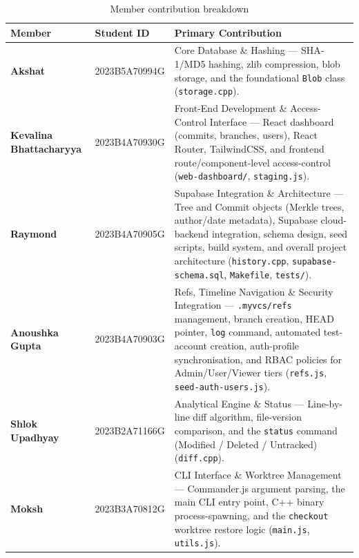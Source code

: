 \documentclass{article}
\begin{document}
\begin{table}[htbp]
\centering
\renewcommand{\arraystretch}{1.4}
\begin{tabular}{l l p{7cm}}
\toprule
Member & Student ID & Primary Contribution \\
\midrule
\textbf{Akshat}
    & 2023B5A70994G
    & Core Database \& Hashing --- SHA-1/MD5 hashing, zlib compression,
      blob storage, and the foundational \texttt{Blob} class
      (\texttt{storage.cpp}). \\
\textbf{Kevalina Bhattacharyya}
    & 2023B4A70930G
    & Front-End Development \& Access-Control Interface --- React dashboard
      (commits, branches, users), React Router, TailwindCSS, and
      frontend route/component-level access-control
      (\texttt{web-dashboard/}, \texttt{staging.js}). \\
\textbf{Raymond}
    & 2023B4A70905G
    & Supabase Integration \& Architecture --- Tree and Commit objects
      (Merkle trees, author/date metadata), Supabase cloud-backend
      integration, schema design, seed scripts, build system, and
      overall project architecture
      (\texttt{history.cpp}, \texttt{supabase-schema.sql},
       \texttt{Makefile}, \texttt{tests/}). \\
\textbf{Anoushka Gupta}
    & 2023B4A70903G
    & Refs, Timeline Navigation \& Security Integration ---
      \texttt{.myvcs/refs} management, branch creation, HEAD pointer,
      \texttt{log} command, automated test-account creation, auth-profile
      synchronisation, and RBAC policies for Admin/User/Viewer tiers
      (\texttt{refs.js}, \texttt{seed-auth-users.js}). \\
\textbf{Shlok Upadhyay}
    & 2023B2A71166G
    & Analytical Engine \& Status --- Line-by-line diff algorithm,
      file-version comparison, and the \texttt{status} command
      (Modified / Deleted / Untracked)
      (\texttt{diff.cpp}). \\
\textbf{Moksh}
    & 2023B3A70812G
    & CLI Interface \& Worktree Management --- Commander.js argument
      parsing, the main CLI entry point, C++ binary process-spawning,
      and the \texttt{checkout} worktree restore logic
      (\texttt{main.js}, \texttt{utils.js}). \\
\bottomrule
\end{tabular}
\caption{Member contribution breakdown}
\label{tab:contributions}
\end{table}

\end{document}
